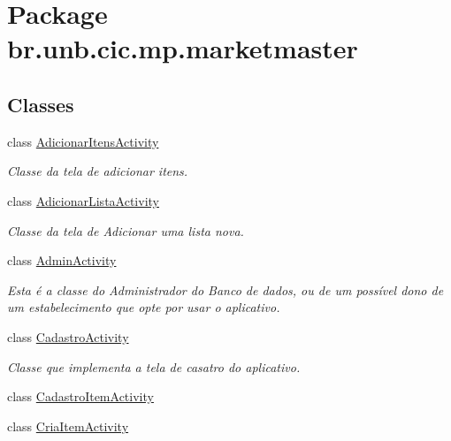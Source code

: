 \hypertarget{namespacebr_1_1unb_1_1cic_1_1mp_1_1marketmaster}{}\section{Package br.\+unb.\+cic.\+mp.\+marketmaster}
\label{namespacebr_1_1unb_1_1cic_1_1mp_1_1marketmaster}
\subsection*{Classes}
\begin{DoxyCompactItemize}
\item 
class \mbox{\hyperlink{classbr_1_1unb_1_1cic_1_1mp_1_1marketmaster_1_1AdicionarItensActivity}{Adicionar\+Itens\+Activity}}
\begin{DoxyCompactList}\small\item\em Classe da tela de adicionar itens. \end{DoxyCompactList}\item 
class \mbox{\hyperlink{classbr_1_1unb_1_1cic_1_1mp_1_1marketmaster_1_1AdicionarListaActivity}{Adicionar\+Lista\+Activity}}
\begin{DoxyCompactList}\small\item\em Classe da tela de Adicionar uma lista nova. \end{DoxyCompactList}\item 
class \mbox{\hyperlink{classbr_1_1unb_1_1cic_1_1mp_1_1marketmaster_1_1AdminActivity}{Admin\+Activity}}
\begin{DoxyCompactList}\small\item\em Esta é a classe do Administrador do Banco de dados, ou de um possível dono de um estabelecimento que opte por usar o aplicativo. \end{DoxyCompactList}\item 
class \mbox{\hyperlink{classbr_1_1unb_1_1cic_1_1mp_1_1marketmaster_1_1CadastroActivity}{Cadastro\+Activity}}
\begin{DoxyCompactList}\small\item\em Classe que implementa a tela de casatro do aplicativo. \end{DoxyCompactList}\item 
class \mbox{\hyperlink{classbr_1_1unb_1_1cic_1_1mp_1_1marketmaster_1_1CadastroItemActivity}{Cadastro\+Item\+Activity}}
\item 
class \mbox{\hyperlink{classbr_1_1unb_1_1cic_1_1mp_1_1marketmaster_1_1CriaItemActivity}{Cria\+Item\+Activity}}

\end{DoxyCompactItemize}
